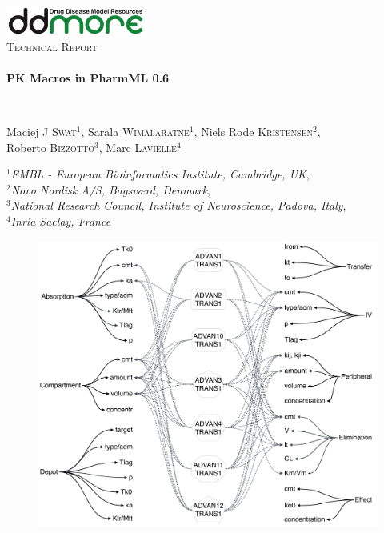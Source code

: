 \begin{titlepage}
\begin{center}

\includegraphics[width=0.35\textwidth]{./logo/ddmore_logo}~\\[1cm]

%
\textsc{\Large Technical Report}\\[0.5cm]

\HRule \\[0.4cm]
{ \huge \bfseries PK Macros in PharmML 0.6 \\[0.4cm] }

\HRule \\[1.5cm]


\begin{minipage}{0.9\textwidth}
\begin{flushleft} \large
Maciej J \textsc{Swat}$^1$, Sarala \textsc{Wimalaratne}$^1$, Niels Rode \textsc{Kristensen}$^2$,\\
Roberto \textsc{Bizzotto}$^3$, Marc \textsc{Lavielle}$^4$ \\
\end{flushleft}
\end{minipage}
\bigskip


\begin{minipage}{0.9\textwidth}
\begin{flushleft} \large
$^1$\emph{EMBL - European Bioinformatics Institute, Cambridge, UK}, \\ 
$^2$\emph{Novo Nordisk A/S, Bagsv\ae rd, Denmark}, \\
$^3$\emph{National Research Council, Institute of Neuroscience, Padova, Italy}, \\
$^4$\emph{Inria Saclay, France}
\end{flushleft}
\end{minipage}


\vfill
\begin{figure}[htb]
\centering
  \includegraphics[width=0.70\linewidth]{pics/AdvanMacrosMaster.pdf}
\end{figure}


\end{center}
\end{titlepage}
